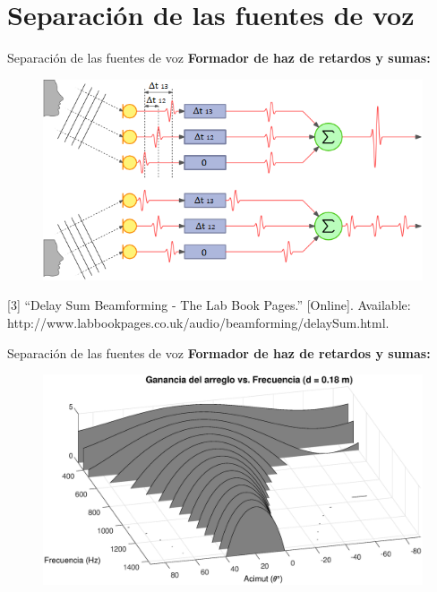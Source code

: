 \documentclass[12pt,aspectratio=169]{beamer}
\begin{document}
	\section{Separación de las fuentes de voz}
	
	\begin{frame}{Separación de las fuentes de voz}
		\textbf{Formador de haz de retardos y sumas:}\\	
		\vspace{5mm}
		\begin{figure}[h]
			\centering
			\includegraphics[width=0.7\linewidth]{figures/steer}
		\end{figure}
		\vspace{-2.5mm}
		\tiny {[3] “Delay Sum Beamforming - The Lab Book Pages.” [Online]. Available: http://www.labbookpages.co.uk/audio/beamforming/delaySum.html.}\\ %
	\end{frame}
	
	\begin{frame}{Separación de las fuentes de voz}
		\textbf{Formador de haz de retardos y sumas:}\\	
		\vspace{5mm}
		\begin{figure}[h]
			\centering
			\includegraphics[width=0.8\linewidth]{figures/patternvsfreq}
		\end{figure}
	\end{frame}
	
\end{document}
